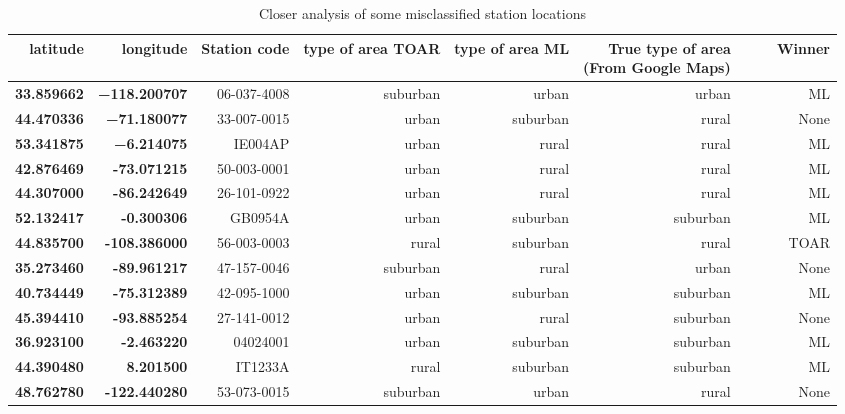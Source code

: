 \documentclass[gmd, manuscript]{copernicus}
\begin{document}
 \begin{table}[htb!]
\centering
\caption{Closer analysis of some misclassified station locations}
\begin{tabular}{|r|r|r|r|r|r|r|}
\hline
latitude  & longitude&   Station code &   type of area TOAR & type of area ML & \makecell{True type of area \\ (From Google Maps)} & ~~~~Winner \\ \hline
\textbf{33.859662} & \textbf{−118.200707} & 06-037-4008  & suburban       & urban           & urban             & ML     \\ \hline
\textbf{44.470336} & \textbf{−71.180077}&  33-007-0015   & urban             & suburban           & rural          & None   \\ \hline
\textbf{53.341875} & \textbf{−6.214075}&  IE004AP  & urban             & rural           & rural             & ML     \\ \hline
\textbf{42.876469} & \textbf{-73.071215}& 50-003-0001 & urban             & rural           & rural             & ML     \\ \hline
\textbf{44.307000} & \textbf{-86.242649}& 26-101-0922 & urban             & rural           & rural             & ML     \\ \hline
\textbf{52.132417} & \textbf{-0.300306}& GB0954A & urban             & suburban          & suburban         & ML     \\ \hline
\textbf{44.835700} & \textbf{-108.386000}& 56-003-0003 & rural             & suburban           & rural          & TOAR   \\ \hline
\textbf{35.273460} & \textbf{-89.961217}& 47-157-0046 & suburban             & rural       & urban             & None   \\ \hline
\textbf{40.734449} & \textbf{-75.312389}& 42-095-1000	  & urban             & suburban           & suburban      & ML   \\ \hline
\textbf{45.394410} & \textbf{-93.885254}& 27-141-0012	& urban             & rural        & suburban             & None     \\ \hline
\textbf{36.923100} & \textbf{-2.463220}& 04024001 & urban             & suburban        & suburban           & ML     \\ \hline
\textbf{44.390480} & \textbf{8.201500}& IT1233A	 & rural             & suburban        & suburban             & ML   \\ \hline
\textbf{48.762780} & \textbf{-122.440280}&  53-073-0015  & suburban            & urban        & rural             & None   \\ \hline

\end{tabular}
\end{table}
\end{document}
